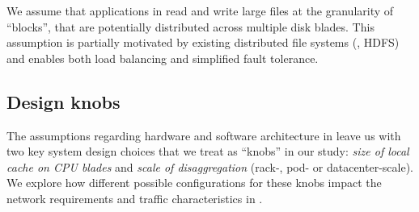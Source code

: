 We assume that applications in \dis read and write large files at the granularity of ``blocks'', that are potentially distributed across multiple disk blades. This assumption is partially motivated by existing distributed file systems (\eg, HDFS) and enables both load balancing and simplified fault tolerance. %

\vspace{-0.1in}
\subsection{Design knobs}
\vspace{-0.05in}
\label{ssec:knobs}
The assumptions regarding hardware and software architecture in \dis leave us with two key system design choices that we treat as ``knobs'' in our study: {\em size of local cache on CPU blades} and {\em scale of disaggregation} (rack-, pod- or datacenter-scale). We explore how different possible configurations for these knobs impact the network requirements and traffic characteristics in \dis.


